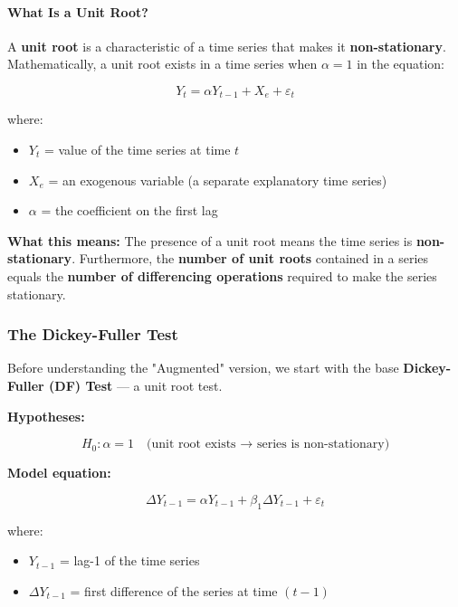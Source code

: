 \documentclass[12pt,openany]{book}
\begin{document}
\paragraph{What Is a Unit Root?}

A \textbf{unit root} is a characteristic of a time series that makes it \textbf{non-stationary}. Mathematically, a unit root exists in a time series when \(\alpha = 1\) in the equation:

\begin{equation*}
    Y_t = \alpha Y_{t-1} + X_e + \varepsilon_t
\end{equation*}

where:
\begin{itemize}[leftmargin=*]
    \item \(Y_t\) = value of the time series at time \(t\)
    \item \(X_e\) = an exogenous variable (a separate explanatory time series)
    \item \(\alpha\) = the coefficient on the first lag
\end{itemize}

\textbf{What this means:} The presence of a unit root means the time series is \textbf{non-stationary}. Furthermore, the \textbf{number of unit roots} contained in a series equals the \textbf{number of differencing operations} required to make the series stationary.

\subsubsection{The Dickey-Fuller Test}

Before understanding the "Augmented" version, we start with the base \textbf{Dickey-Fuller (DF) Test} --- a unit root test.

\textbf{Hypotheses:}

\begin{equation*}
    H_0: \alpha = 1 \quad \text{(unit root exists → series is non-stationary)}
\end{equation*}

\textbf{Model equation:}

\begin{equation*}
    \Delta Y_{t-1} = \alpha Y_{t-1} + \beta_1 \Delta Y_{t-1} + \varepsilon_t
\end{equation*}

where:
\begin{itemize}[leftmargin=*]
    \item \(Y_{t-1}\) = lag-1 of the time series
    \item \(\Delta Y_{t-1}\) = first difference of the series at time \((t-1)\)
\end{itemize}
\end{document}
